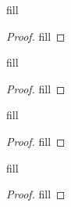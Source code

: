 \begin{exercise}{26}
fill
\end{exercise}
\begin{proof}
fill
\end{proof} 

\begin{exercise}{27}
fill
\end{exercise}
\begin{proof}
fill
\end{proof} 

\begin{exercise}{31}
fill
\end{exercise}
\begin{proof}
fill
\end{proof} 

\begin{exercise}{33}
fill
\end{exercise}
\begin{proof}
fill
\end{proof} 
